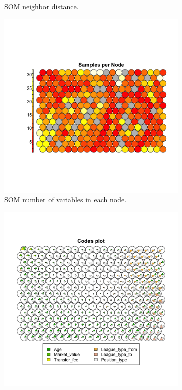 \begin{figure}[t]
\begin{subfigure}[b]{0.4\textwidth}
        \caption{SOM neighbor distance.}
        \label{fig:transfer-neighbor-dist}
    \end{subfigure}
    \begin{subfigure}[b]{0.45\textwidth}
        \centering
        \includegraphics[width=\textwidth]{../figs/transfer_node_samples.png}
        \caption{SOM number of variables in each node.}
        \label{fig:transfer-nvar}
    \end{subfigure}
    \begin{subfigure}[b]{0.45\textwidth}
        \centering
        \includegraphics[width=\textwidth]{../figs/transfer_codebook.png}

\end{subfigure}
\end{figure}
